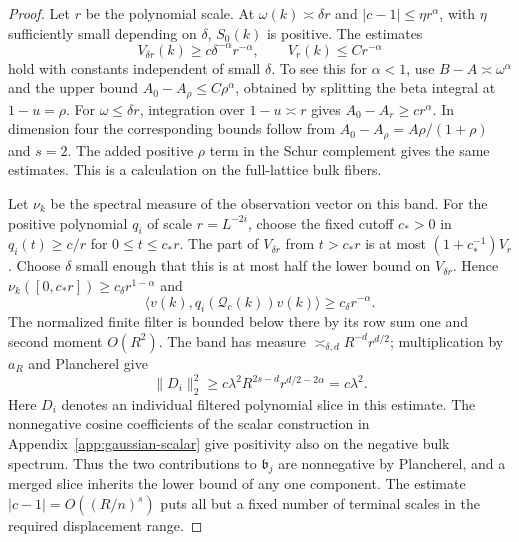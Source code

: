 \documentclass[11pt]{article}
\theoremstyle{definition}
\begin{document}
\begin{proof}
Let \(r\) be the polynomial scale. At \(\omega(k)\asymp\delta r\)
and \(|c-1|\le \eta r^\alpha\), with \(\eta\) sufficiently small
depending on \(\delta\), \(S_0(k)\) is positive. The estimates
\begin{equation}
   V_{\delta r}(k)\ge c\delta^{-\alpha}r^{-\alpha},
           \qquad V_r(k)\le C r^{-\alpha}
\end{equation}
hold with constants independent of small \(\delta\). To see this
for \(\alpha<1\), use \(B-A\asymp\omega^\alpha\) and the upper
bound \(A_0-A_\rho\le C\rho^\alpha\), obtained by splitting the
beta integral at \(1-u=\rho\). For \(\omega\le\delta r\),
integration over \(1-u\asymp r\) gives
\(A_0-A_r\ge c r^\alpha\). In dimension four the corresponding
bounds follow from \(A_0-A_\rho=A\rho/(1+\rho)\) and \(s=2\).
The added positive \(\rho\) term in the Schur complement gives
the same estimates. This is a calculation on the full-lattice
bulk fibers.

Let \(\nu_k\) be the spectral measure of the observation vector
on this band. For the positive polynomial \(q_i\) of scale
\(r=L^{-2i}\), choose the fixed cutoff \(c_*>0\) in
\(q_i(t)\ge c/r\) for \(0\le t\le c_*r\).
The part of \(V_{\delta r}\) from \(t>c_*r\) is at most
\((1+c_*^{-1})V_r\). Choose \(\delta\) small enough that this
is at most half the lower bound on \(V_{\delta r}\). Hence
\(\nu_k([0,c_*r])\ge c_\delta r^{1-\alpha}\) and
\begin{equation}
 \langle v(k),q_i(\mathcal Q_c(k))v(k)\rangle
       \ge c_\delta r^{-\alpha}.
\end{equation}
The normalized finite filter is bounded below there by its row
sum one and second moment \(O(R^2)\).
The band has measure \(\asymp_{\delta,d}R^{-d}r^{d/2}\);
multiplication by \(a_R\) and Plancherel give
\begin{equation}
 \|D_i\|_2^2\ge c\lambda^2 R^{2s-d} r^{d/2-2\alpha}
             =c\lambda^2 .
\end{equation}
Here \(D_i\) denotes an individual filtered polynomial slice in
this estimate. The nonnegative cosine coefficients of the scalar construction
in Appendix~\ref{app:gaussian-scalar} give positivity also on the
negative bulk spectrum.
Thus the two contributions to \(\mathfrak b_j\) are nonnegative
by Plancherel, and a merged slice inherits the lower bound of
any one component. The estimate \(|c-1|=O((R/n)^s)\) puts
all but a fixed number of terminal scales in the required
displacement range.


\end{proof}
\end{document}
